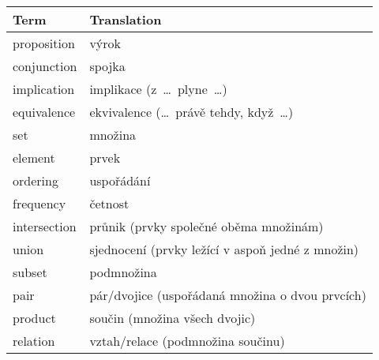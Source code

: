 \documentclass[a4paper,12pt]{article}
\begin{document}
\begin{center}

\renewcommand{\arraystretch}{1.5}
\begin{tabular}{l | l}
 \textbf{Term} & \textbf{Translation}\\
 \toprule
 proposition       & výrok\\
 conjunction       & spojka\\
 implication       & implikace (z~\dots~plyne~\dots)\\
 equivalence       & ekvivalence (\dots~právě tehdy, když~\dots)\\
 set               & množina\\
 element           & prvek\\
 ordering          & uspořádání\\
 frequency         & četnost\\
 intersection      & průnik (prvky společné oběma množinám)\\
 union             & sjednocení (prvky ležící v aspoň jedné z množin)\\
 subset            & podmnožina\\
 pair              & pár/dvojice (uspořádaná množina o dvou prvcích)\\
 product           & součin (množina všech dvojic)\\
 relation          & vztah/relace (podmnožina součinu)
\end{tabular}
 
\end{center}
\end{document}
